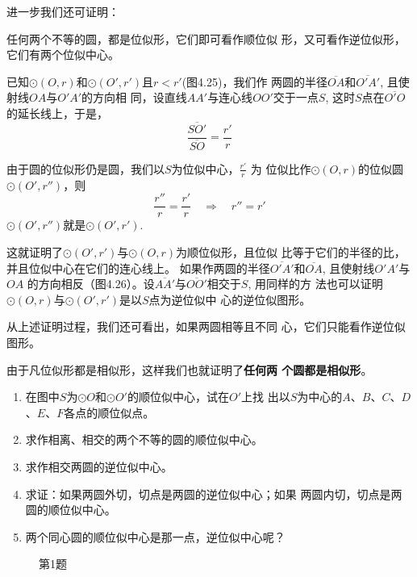 进一步我们还可证明：

\begin{blk}{}
任何两个不等的圆，都是位似形，它们即可看作顺位似
形，又可看作逆位似形，它们有两个位似中心。
\end{blk}

已知$\odot (O,r)$和$\odot (O',r')$且$r<r'$(图4.25)，我们作
两圆的半径$\overline{OA}$和$\overline{O'A'}$, 且使射线$OA$与$O'A'$的方向相
同，设直线$AA'$与连心线$OO'$交于一点$S$, 这时$S$点在$\overline{O'O}$
的延长线上，于是，
\[\frac{\overline{SO'}}{\overline{SO}}=\frac{r'}{r}\]

由于圆的位似形仍是圆，我们以$S$为位似中心，$\frac{r'}{r}$
为
位似比作$\odot (O,r)$的位似圆$\odot (O',r'')$，则
\[\frac{r''}{r}=\frac{r'}{r}\quad \Rightarrow\quad r''=r'\]
$\odot (O',r'')$就是$\odot (O',r')$.

这就证明了$\odot (O',r')$与$\odot (O,r)$为顺位似形，且位似
比等于它们的半径的比，并且位似中心在它们的连心线上。
如果作两圆的半径$\overline{O'A'}$和$\overline{OA}$, 且使射线$O'A'$与$OA$
的方向相反（图4.26）。设$\overline{AA'}$与$\overline{OO'}$相交于$S$, 用同样的方
法也可以证明$\odot (O,r)$与$\odot (O',r')$是以$S$点为逆位似中
心的逆位似图形。

从上述证明过程，我们还可看出，如果两圆相等且不同
心，它们只能看作逆位似图形。

由于凡位似形都是相似形，这样我们也就证明了\textbf{任何两
个圆都是相似形}。

\begin{ex}
\begin{enumerate}
    \item 在图中$S$为$\odot O$和$\odot O'$的顺位似中心，试在$O'$上找
    出以$S$为中心的$A$、$B$、$C$、$D$、$E$、$F$各点的顺位似点。
    \item 求作相离、相交的两个不等的圆的顺位似中心。
    \item 求作相交两圆的逆位似中心。
    \item 求证：如果两圆外切，切点是两圆的逆位似中心；如果
    两圆内切，切点是两圆的顺位似中心。
    \item 两个同心圆的顺位似中心是那一点，逆位似中心呢？
\end{enumerate}
\end{ex}

\begin{figure}[htp]
    \centering
{}
    \caption*{第1题}
\end{figure}

